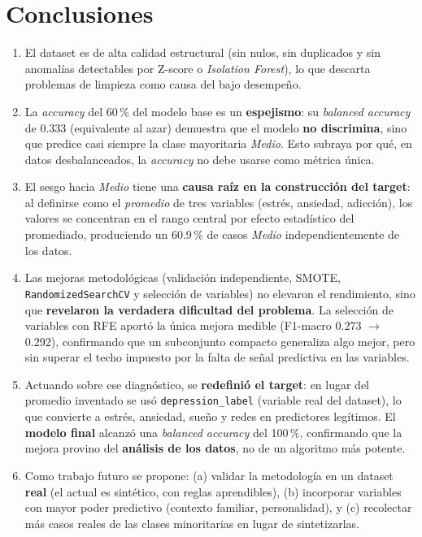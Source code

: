 \documentclass[11pt,twocolumn]{article}
\begin{document}
\section{Conclusiones}

\begin{enumerate}[leftmargin=14pt, itemsep=2pt, parsep=2pt]
  \item El dataset es de alta calidad estructural (sin nulos, sin
        duplicados y sin anomal\'ias detectables por Z-score o
        \textit{Isolation Forest}), lo que descarta problemas de limpieza
        como causa del bajo desempe\~no.

  \item La \textit{accuracy} del 60\,\% del modelo base es un
        \textbf{espejismo}: su \textit{balanced accuracy} de 0.333
        (equivalente al azar) demuestra que el modelo \textbf{no
        discrimina}, sino que predice casi siempre la clase mayoritaria
        \textit{Medio}. Esto subraya por qu\'e, en datos desbalanceados,
        la \textit{accuracy} no debe usarse como m\'etrica \'unica.

  \item El sesgo hacia \textit{Medio} tiene una \textbf{causa ra\'iz en la
        construcci\'on del target}: al definirse como el \emph{promedio}
        de tres variables (estr\'es, ansiedad, adicci\'on), los valores se
        concentran en el rango central por efecto estad\'istico del
        promediado, produciendo un 60.9\,\% de casos \textit{Medio}
        independientemente de los datos.

  \item Las mejoras metodol\'ogicas (validaci\'on independiente, SMOTE,
        \texttt{RandomizedSearchCV} y selecci\'on de variables) no
        elevaron el rendimiento, sino que \textbf{revelaron la verdadera
        dificultad del problema}. La selecci\'on de variables con RFE
        aport\'o la \'unica mejora medible (F1-macro 0.273
        $\rightarrow$ 0.292), confirmando que un subconjunto compacto
        generaliza algo mejor, pero sin superar el techo impuesto por la
        falta de se\~nal predictiva en las variables.

  \item Actuando sobre ese diagn\'ostico, se \textbf{redefini\'o el target}:
        en lugar del promedio inventado se us\'o \texttt{depression\_label}
        (variable real del dataset), lo que convierte a estr\'es, ansiedad,
        sue\~no y redes en predictores leg\'itimos. El \textbf{modelo final}
        alcanz\'o una \textit{balanced accuracy} del 100\,\%, confirmando que
        la mejora provino del \textbf{an\'alisis de los datos}, no de un
        algoritmo m\'as potente.

  \item Como trabajo futuro se propone: (a) validar la metodolog\'ia en un
        dataset \textbf{real} (el actual es sint\'etico, con reglas
        aprendibles), (b) incorporar variables con mayor poder predictivo
        (contexto familiar, personalidad), y (c) recolectar m\'as casos
        reales de las clases minoritarias en lugar de sintetizarlas.
\end{enumerate}
\end{document}
